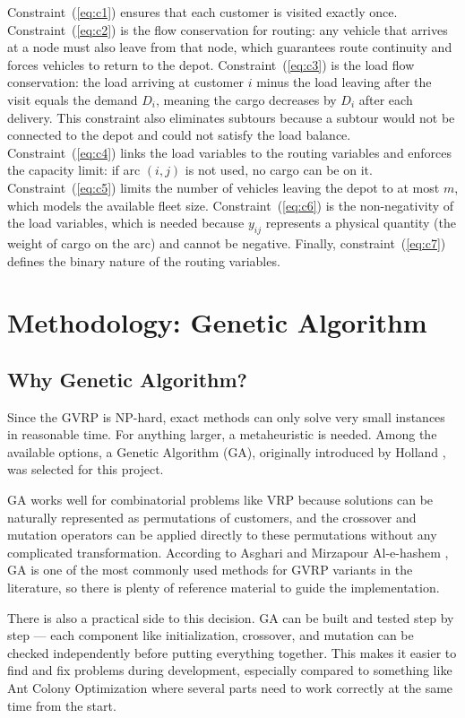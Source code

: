 \documentclass [a4paper, 11pt, titlepage] {article}
\begin{document}
Constraint~(\ref{eq:c1}) ensures that each customer is visited exactly once. Constraint~(\ref{eq:c2}) is the flow conservation for routing: any vehicle that arrives at a node must also leave from that node, which guarantees route continuity and forces vehicles to return to the depot. Constraint~(\ref{eq:c3}) is the load flow conservation: the load arriving at customer $i$ minus the load leaving after the visit equals the demand $D_i$, meaning the cargo decreases by $D_i$ after each delivery. This constraint also eliminates subtours because a subtour would not be connected to the depot and could not satisfy the load balance. Constraint~(\ref{eq:c4}) links the load variables to the routing variables and enforces the capacity limit: if arc $(i,j)$ is not used, no cargo can be on it. Constraint~(\ref{eq:c5}) limits the number of vehicles leaving the depot to at most $m$, which models the available fleet size. Constraint~(\ref{eq:c6}) is the non-negativity of the load variables, which is needed because $y_{ij}$ represents a physical quantity (the weight of cargo on the arc) and cannot be negative. Finally, constraint~(\ref{eq:c7}) defines the binary nature of the routing variables.

\section{Methodology: Genetic Algorithm}
\label{sec:method}

\subsection{Why Genetic Algorithm?}

Since the GVRP is NP-hard, exact methods can only solve very small instances in reasonable time. For anything larger, a metaheuristic is needed. Among the available options, a Genetic Algorithm (GA), originally introduced by Holland \cite{holland1975}, was selected for this project.

GA works well for combinatorial problems like VRP because solutions can be naturally represented as permutations of customers, and the crossover and mutation operators can be applied directly to these permutations without any complicated transformation. According to Asghari and Mirzapour Al-e-hashem \cite{asghari2021}, GA is one of the most commonly used methods for GVRP variants in the literature, so there is plenty of reference material to guide the implementation.

There is also a practical side to this decision. GA can be built and tested step by step --- each component like initialization, crossover, and mutation can be checked independently before putting everything together. This makes it easier to find and fix problems during development, especially compared to something like Ant Colony Optimization where several parts need to work correctly at the same time from the start.
\end{document}

